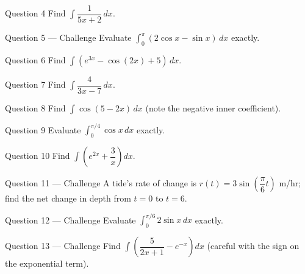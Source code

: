 \documentclass[11pt]{article}
\begin{document}
\begin{qbox}{Question 4}
Find $\displaystyle\int\dfrac{1}{5x+2}\,dx$.\workspace{2.4cm}
\end{qbox}

\begin{qbox}{Question 5 --- Challenge}
Evaluate $\displaystyle\int_0^{\pi}(2\cos x-\sin x)\,dx$ exactly.\workspace{3.2cm}
\end{qbox}

\begin{qbox}{Question 6}
Find $\displaystyle\int(e^{3x}-\cos(2x)+5)\,dx$.\workspace{2.4cm}
\end{qbox}

\begin{qbox}{Question 7}
Find $\displaystyle\int\dfrac{4}{3x-7}\,dx$.\workspace{2.4cm}
\end{qbox}

\begin{qbox}{Question 8}
Find $\displaystyle\int\cos(5-2x)\,dx$ (note the negative inner coefficient).\workspace{2.4cm}
\end{qbox}

\begin{qbox}{Question 9}
Evaluate $\displaystyle\int_0^{\pi/4}\cos x\,dx$ exactly.\workspace{2.4cm}
\end{qbox}

\begin{qbox}{Question 10}
Find $\displaystyle\int\left(e^{2x}+\dfrac{3}{x}\right)dx$.\workspace{2.4cm}
\end{qbox}

\begin{qbox}{Question 11 --- Challenge}
A tide's rate of change is $r(t)=3\sin\!\left(\dfrac{\pi}6t\right)$ m/hr; find the net change in depth from $t=0$ to $t=6$.\workspace{3.2cm}
\end{qbox}

\begin{qbox}{Question 12 --- Challenge}
Evaluate $\displaystyle\int_0^{\pi/6}2\sin x\,dx$ exactly.\workspace{3cm}
\end{qbox}

\begin{qbox}{Question 13 --- Challenge}
Find $\displaystyle\int\left(\dfrac{5}{2x+1}-e^{-x}\right)dx$ (careful with the sign on the exponential term).\workspace{3.2cm}
\end{qbox}

\clearpage
{}
\end{document}
